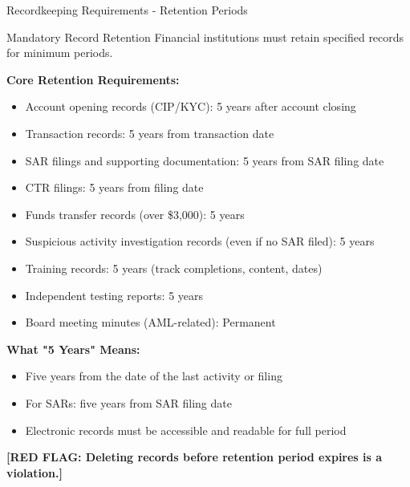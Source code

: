 \documentclass[11pt,a4paper]{beamer}
\newcommand{\redflag}[1]{\textcolor{red!80!black}{\textbf{[RED FLAG: #1]}}}
\begin{document}
	\begin{frame}{Recordkeeping Requirements - Retention Periods}
		\begin{block}{Mandatory Record Retention}
			Financial institutions must retain specified records for minimum periods.
		\end{block}
		\textbf{Core Retention Requirements:}
		\begin{itemize}
			\item Account opening records (CIP/KYC): 5 years after account closing
			\item Transaction records: 5 years from transaction date
			\item SAR filings and supporting documentation: 5 years from SAR filing date
			\item CTR filings: 5 years from filing date
			\item Funds transfer records (over \$3,000): 5 years
			\item Suspicious activity investigation records (even if no SAR filed): 5 years
			\item Training records: 5 years (track completions, content, dates)
			\item Independent testing reports: 5 years
			\item Board meeting minutes (AML-related): Permanent
		\end{itemize}
		\textbf{What "5 Years" Means:}
		\begin{itemize}
			\item Five years from the date of the last activity or filing
			\item For SARs: five years from SAR filing date
			\item Electronic records must be accessible and readable for full period
		\end{itemize}
		\redflag{Deleting records before retention period expires is a violation.}
	\end{frame}
	
	
\end{document}
